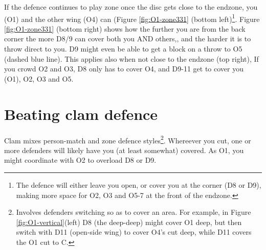 \documentclass{tufte-handout}
\begin{document}
If the defence 
continues to play zone 
once the disc 
gets close to the endzone, 
you (O1) 
and the other wing (O4) 
can 
(Figure \ref{fig:O1-zone331} (bottom left)\footnote{ 
The defence 
will either  
leave you open,
or cover you
at the corner
(D8 
or D9), 
making more space 
for O2, 
O3 and
O5-7 
at the front of the endzone.}.
Figure \ref{fig:O1-zone331} (bottom right) shows 
how the further 
you are from the back corner 
the more D8/9 
can cover both you
AND others,, 
and the harder 
it is to throw direct to you.
D9 might even be able to get a block
on a throw to O5
(dashed blue line). 
This applies also when 
not close to the endzone 
(top right),
If you crowd O2 and O3,
D8 only has to cover O4, 
and D9-11 get to cover 
you (O1),
O2, 
O3 and 
O5.

\section{Beating clam defence}\label{sec:zone}
Clam mixes person-match 
and zone defence styles\footnote{
Involves defenders 
switching 
so as to cover 
an area. 
For example, 
in Figure \ref{fig:O1-vertical}(left) 
D8 
(the deep-deep) 
might cover 
O1 deep, 
but then switch with D11 
(open-side wing)
to cover O4's cut deep, 
while D11 covers 
the O1 
cut to C.}.
Whereever you cut, 
one or more defenders
will likely have you
(at least somewhat) covered. 
As O1, 
you might
coordinate 
with O2
to overload
D8 or D9.
\end{document}
